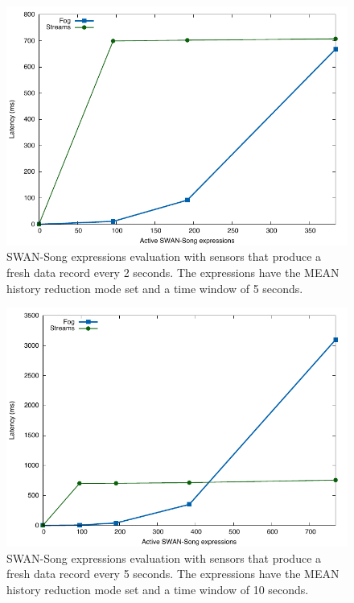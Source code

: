  \begin{figure}[h!]
\includegraphics[width=1\textwidth]{images/2_0.pdf}
 \caption{SWAN-Song expressions evaluation with sensors that produce a fresh data record every 2 seconds. The expressions have the MEAN history reduction mode set and a time window of 5 seconds.}
\label{fig:2_0}
\end{figure}

\newpage

 \begin{figure}[h!]
\includegraphics[width=1\textwidth]{images/5_0.pdf}
 \caption{SWAN-Song expressions evaluation with sensors that produce a fresh data record every 5 seconds. The expressions have the MEAN history reduction mode set and a time window of 10 seconds.}
\label{fig:5_0}
\end{figure}


